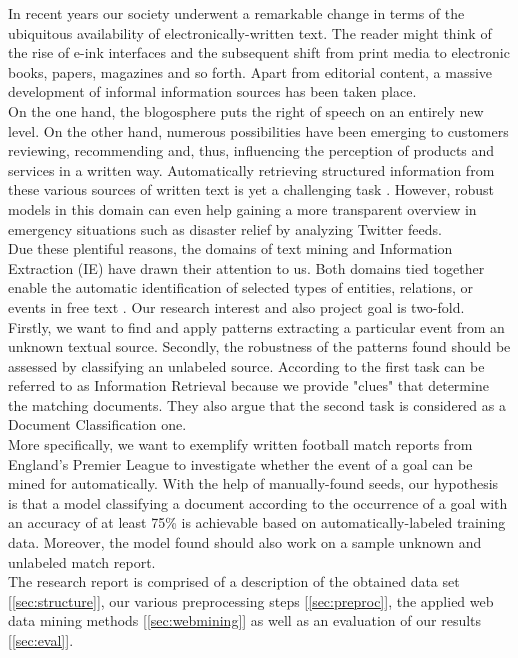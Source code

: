 \documentclass[11pt,titlepage,oneside,openany]{book}
\begin{document}
In recent years our society underwent a remarkable change in terms of the ubiquitous availability of electronically-written text. The reader might think of the rise of e-ink interfaces and the subsequent shift from print media to electronic books, papers, magazines and so forth. Apart from editorial content, a massive development of informal information sources has been taken place.\\ 
On the one hand, the blogosphere puts the right of speech on an entirely new level. On the other hand, numerous possibilities have been emerging to customers reviewing, recommending and, thus, influencing the perception of products and services in a written way. Automatically retrieving structured information from these various sources of written text is yet a challenging task \citep[p.1]{Cellier2010}. However, robust models in this domain can even help gaining a more transparent overview in emergency situations such as disaster relief by analyzing Twitter feeds.\\

Due these plentiful reasons, the domains of text mining and Information Extraction (IE) have drawn their attention to us. Both domains tied together enable the automatic identification of selected types of entities, relations, or events in free text \citep[p.545]{Grishman2005}. Our research interest and also project goal is two-fold. Firstly, we want to find and apply patterns extracting a particular event from an unknown textual source. Secondly, the robustness of the patterns found should be assessed by classifying an unlabeled source. According to \citeauthor*{Weiss2005} \citeyearpar{Weiss2005} the first task can be referred to as Information Retrieval because we provide "clues" that determine the matching documents. They also argue that the second task is considered as a Document Classification one.\\

More specifically, we want to exemplify written football match reports from England's Premier League to investigate whether the event of a goal can be mined for automatically. With the help of manually-found seeds, our hypothesis is that a model classifying a document according to the occurrence of a goal with an accuracy of at least 75\% is achievable based on automatically-labeled training data. Moreover, the model found should also work on a sample unknown and unlabeled match report.\\

The research report is comprised of a description of the obtained data set [\ref{sec:structure}], our various preprocessing steps [\ref{sec:preproc}], the applied web data mining methods [\ref{sec:webmining}] as well as an evaluation of our results [\ref{sec:eval}].
\end{document}
